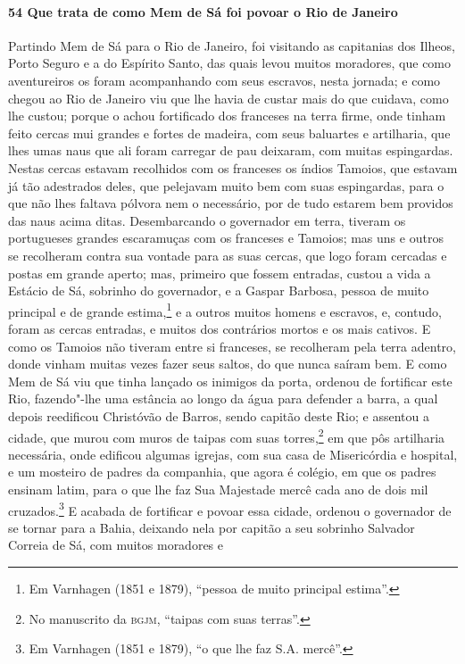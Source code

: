 \begin{linenumbers}
\paragraph{54 Que trata de como Mem de Sá foi povoar o Rio de Janeiro} \quad
Partindo Mem de Sá para o Rio de Janeiro, foi visitando as capitanias dos Ilheos, Porto
Seguro e a do Espírito Santo, das quais levou muitos moradores, que como aventureiros os
foram acompanhando com seus escravos, nesta jornada; e como chegou ao Rio de Janeiro viu
que lhe havia de custar mais do que cuidava, como lhe custou; porque o achou fortificado
dos franceses na terra firme, onde tinham feito cercas mui grandes e fortes de madeira,
com seus baluartes e artilharia, que lhes umas naus que ali foram carregar de pau
deixaram, com muitas espingardas. Nestas cercas estavam recolhidos com os franceses os
índios Tamoios, que estavam já tão adestrados deles, que pelejavam muito bem com suas
espingardas, para o que não lhes faltava pólvora nem o necessário, por de tudo estarem bem
providos das naus acima ditas. Desembarcando o governador em terra, tiveram os portugueses
grandes escaramuças com os franceses e Tamoios; mas uns e outros se recolheram contra sua
vontade para as suas cercas, que logo foram cercadas e postas em grande aperto; mas,
primeiro que fossem entradas, custou a vida a Estácio de Sá, sobrinho do governador, e a
Gaspar Barbosa, pessoa de muito principal e de grande estima,\footnote{ Em Varnhagen (1851
e 1879), ``pessoa de muito principal estima''.} e a outros muitos homens e escravos, e,
contudo, foram as cercas entradas, e muitos dos contrários mortos e os mais cativos. E
como os Tamoios não tiveram entre si franceses, se recolheram pela terra adentro, donde
vinham muitas vezes fazer seus saltos, do que nunca saíram bem. E como Mem de Sá viu que
tinha lançado os inimigos da porta, ordenou de fortificar este Rio, fazendo"-lhe uma
estância ao longo da água para defender a barra, a qual depois reedificou Christóvão de
Barros, sendo capitão deste Rio; e assentou a cidade, que murou com muros de taipas com
suas torres,\footnote{ No manuscrito da \textsc{bgjm}, ``taipas com suas terras''.} em que
pôs artilharia necessária, onde edificou algumas igrejas, com sua casa de Misericórdia e
hospital, e um mosteiro de padres da companhia, que agora é colégio, em que os padres
ensinam latim, para o que lhe faz Sua Majestade mercê cada ano de dois mil
cruzados.\footnote{ Em Varnhagen (1851 e 1879), ``o que lhe faz S.A. mercê''.} E acabada
de fortificar e povoar essa cidade, ordenou o governador de se tornar para a Bahia,
deixando nela por capitão a seu sobrinho Salvador Correia de Sá, com muitos moradores e

\end{linenumbers}

